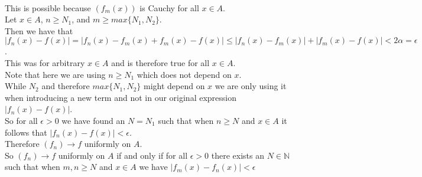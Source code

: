 \documentclass{article}
\begin{document}
\begin{center}
    \\This is possible because $(f_m (x))$ is Cauchy for all $x\in A$.
    \\Let $x\in A$, $n\geq N_1$, and $m\geq max\{N_1, N_2\}$.
    \\Then we have that $|f_n (x) - f(x)| = |f_n (x) - f_m (x) + f_m (x) - f(x)|\leq |f_n (x) - f_m (x)| + |f_m (x) - f(x)| < 2\alpha =\epsilon$.
    \\This was for arbitrary $x\in A$ and is therefore true for all $x\in A$.
    \\Note that here we are using $n\geq N_1$ which does not depend on $x$.
    \\While $N_2$ and therefore $max\{N_1, N_2\}$ might depend on $x$ we are only using it when introducing a new term and not in our original expression $|f_n (x) - f(x)|$.
    \\So for all $\epsilon > 0$ we have found an $N = N_1$ such that when $n\geq N$ and $x\in A$ it follows that $|f_n (x) - f(x)| <\epsilon$.
    \\Therefore $(f_n)\rightarrow f$ uniformly on $A$.
    \break
    \\So $(f_n)\rightarrow f$ uniformly on $A$ if and only if for all $\epsilon > 0$ there exists an $N\in\mathbb{N}$ such that when $m, n\geq N$ and $x\in A$ we have $|f_m (x) - f_n (x)| <\epsilon$ \qedsymbol
\end{center}


\newpage
\end{document}
